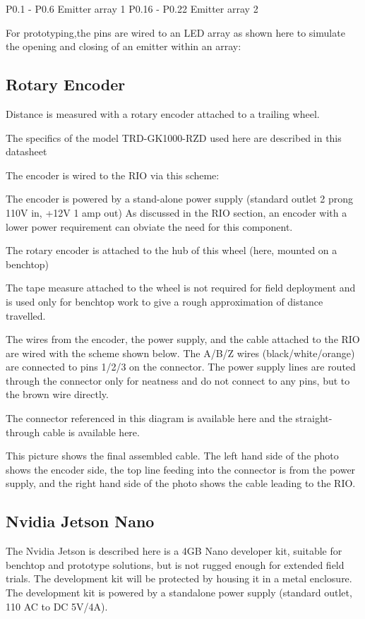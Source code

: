 \documentclass[letterpaper]{article}
\begin{document}
P0.1 - P0.6 Emitter array 1
P0.16 - P0.22 Emitter array 2

For prototyping,the pins are wired to an LED array as shown here to simulate the opening and closing of an emitter within an array:


\subsection{Rotary Encoder}
Distance is measured with a rotary encoder attached to a trailing wheel.

The specifics of the model TRD-GK1000-RZD used here are described in this datasheet

The encoder is wired to the RIO via this scheme:

The encoder is powered by a stand-alone power supply (standard outlet 2 prong 110V in, +12V 1 amp out) As discussed in the RIO section, an encoder with a lower power requirement can obviate the need for this component.

The rotary encoder is attached to the hub of this wheel (here, mounted on a benchtop)



The tape measure attached to the wheel is not required for field deployment and is used only for benchtop work to give a rough approximation of distance travelled.

The wires from the encoder, the power supply, and the cable attached to the RIO are wired with the scheme shown below.  The A/B/Z wires (black/white/orange) are connected to pins 1/2/3 on the connector. The power supply lines are routed through the connector only for neatness and do not connect to any pins, but to the brown wire directly. 

The connector referenced in this diagram is available here and the straight-through cable is available here.


This picture shows the final assembled cable.  The left hand side of the photo shows the encoder side, the top line feeding into the connector is from the power supply, and the right hand side of the photo shows the cable leading to the RIO.


\subsection{Nvidia Jetson Nano}

The Nvidia Jetson is described here is a 4GB Nano developer kit, suitable for benchtop and prototype solutions, but is not rugged enough for extended field trials. The development kit will be protected by housing it in a metal enclosure. The development kit is powered by a standalone power supply (standard outlet, 110 AC to DC 5V/4A).
\end{document}
